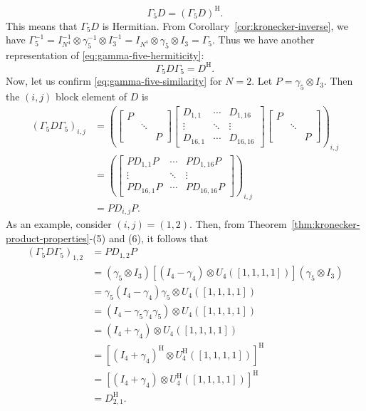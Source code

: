 \[\Gamma_5D=(\Gamma_5D)^{\mathrm H}.\]
{This means that $\Gamma_5D$ is Hermitian. From Corollary\ \ref{cor:kronecker-inverse}, we have $\Gamma_5^{-1}=I_{N^4}^{-1}\otimes\gamma_5^{-1}\otimes I_3^{-1}=I_{N^4}\otimes\gamma_5\otimes I_3=\Gamma_5$. Thus we have another representation of \eqref{eq:gamma-five-hermiticity}:}
\begin{equation}\label{eq:gamma-five-similarity}
\Gamma_5D\Gamma_5=D^{\mathrm H}.
\end{equation}
{Now, let us confirm \eqref{eq:gamma-five-similarity} for $N=2$. Let $P=\gamma_5\otimes I_3$. Then the $(i,j)$ block element of $D$ is}
\[\begin{aligned}
(\Gamma_5D\Gamma_5)_{i,j}
&=\left(\begin{bmatrix}P&&\\&\ddots&\\&&P\end{bmatrix}
\begin{bmatrix}D_{1,1}&\cdots&D_{1,16}\\\vdots&\ddots&\vdots\\D_{16,1}&\cdots&D_{16,16}\end{bmatrix}
\begin{bmatrix}P&&\\&\ddots&\\&&P\end{bmatrix}\right)_{i,j}\\
&=\left(\begin{bmatrix}PD_{1,1}P&\cdots&PD_{1,16}P\\\vdots&\ddots&\vdots\\PD_{16,1}P&\cdots&PD_{16,16}P\end{bmatrix}\right)_{i,j}\\
&=PD_{i,j}P.
\end{aligned}\]
{As an example, consider $(i,j)=(1,2)$. Then, from Theorem\ \ref{thm:kronecker-product-properties}-(5) and (6), it follows that}
\[\begin{aligned}
(\Gamma_5D\Gamma_5)_{1,2}&=PD_{1,2}P\\
&=(\gamma_5\otimes I_3)[(I_4-\gamma_4)\otimes U_4([1,1,1,1])](\gamma_5\otimes I_3)\\
&=\gamma_5(I_4-\gamma_4)\gamma_5\otimes U_4([1,1,1,1])\\
&=(I_4-\gamma_5\gamma_4\gamma_5)\otimes U_4([1,1,1,1])\\
&=(I_4+\gamma_4)\otimes U_4([1,1,1,1])\\
&=[(I_4+\gamma_4)^{\mathrm H}\otimes U_4^{\mathrm H}([1,1,1,1])]^{\mathrm H}\\
&=[(I_4+\gamma_4)\otimes U_4^{\mathrm H}([1,1,1,1])]^{\mathrm H}\\
&=D_{2,1}^{\mathrm H}.
\end{aligned}\]
